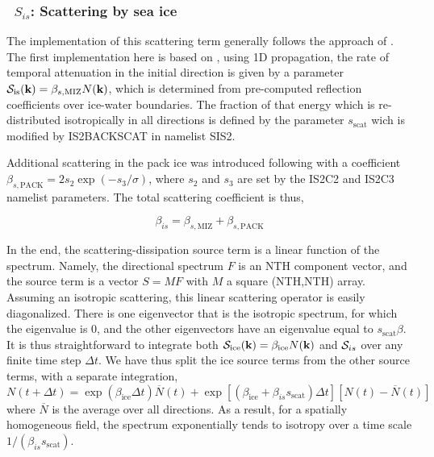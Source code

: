 \vsssub
\subsubsection{~$S_{is}$: Scattering by sea ice} \label{sec:IS2}
\vsssub


\noindent
The implementation of this scattering term generally 
follows the approach of \cite{art:MM06}. The first implementation here is based on \cite{art:KM08}, 
using 1D propagation, the rate of temporal attenuation in the initial direction is given by a 
parameter ${\cal S}_{\mathrm{is}}({\mbox{\bf k}}) = \beta_{s,\mathrm{MIZ}} N(\textbf{k})$, which is determined from pre-computed reflection coefficients 
over ice-water boundaries. The fraction of that energy which is re-distributed 
isotropically in all directions is defined by the  parameter $s_\mathrm{scat}$ wich is modified by 
{\code IS2BACKSCAT} in namelist SIS2. 

Additional scattering in the pack ice was introduced following \cite{art:SVB09} with a coefficient 
$\beta_{s,\mathrm{PACK}}=2 s_2 \exp(-s_3 / \sigma)$, where $s_2$ and $s_3$ are set by the 
{\code IS2C2} and {\code IS2C3} namelist parameters.  The total scattering coefficient is thus, 

\begin{equation}\label{eq:is2}
  \beta_{is} = \beta_{s,\mathrm{MIZ}} + \beta_{s,\mathrm{PACK}}
\end{equation}

In the end, the scattering-dissipation source term 
is a linear function of the spectrum. Namely, the directional spectrum $F$ is an {\F NTH} component vector, 
and the source term is a vector $S = M F$ with $M$ a square ({\F NTH,NTH}) array. Assuming an isotropic 
scattering, this linear scattering operator is easily diagonalized. There is one eigenvector that is 
the isotropic spectrum, for which the eigenvalue is 0, and the other eigenvectors have an eigenvalue equal 
to $s_\mathrm{scat} \beta$. It is thus straightforward to integrate both 
${\cal S}_{\mathrm{ice}}({\mbox{\bf k}}) = \beta_{\mathrm{ice}}N(\textbf{k})$ and ${\cal S}_{is}$ over any finite 
time step $\Delta t$. We have thus split the ice source terms from the other source terms, with a separate integration, 
\begin{equation}\label{eq:is2}
 N(t+\Delta t) = \exp(\beta_{\mathrm{ice}} \Delta t) \overline{N}(t)  + \exp \left[\left(\beta_{\mathrm{ice}} + \beta_{is} s_\mathrm{scat}\right) \Delta t\right] \left[N(t)-\overline{N}(t)\right]
\end{equation}
where $\overline{N}$ is the average over all directions. As a result, for a spatially homogeneous field, 
the spectrum exponentially tends to isotropy over a time scale $1/(\beta_{is} s_\mathrm{scat})$.



